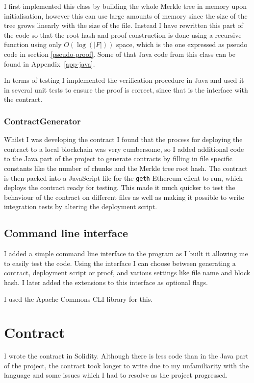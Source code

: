 \documentclass[12pt,a4paper,twoside,openright]{report}
\begin{document}
I first implemented this class by building the whole Merkle tree in memory upon initialisation,
however this can use large amounts of memory since the size of the tree grows linearly with the size of the file.
Instead I have rewritten this part of the code so that the root hash and proof construction is done using a recursive function using only $O(\log(|F|))$ space,
which is the one expressed as pseudo code in section \ref{pseudo-proof}. Some of that Java code from this class can be found in Appendix~\ref{app-java}.

In terms of testing I implemented the verification procedure in Java
and used it in several unit tests to ensure the proof is correct, since that is the interface with the contract.


\subsubsection{ContractGenerator}

Whilst I was developing the contract I found that the process for deploying the contract to a local blockchain was very cumbersome, so
I added additional code to the Java part of the project to generate contracts by filling in file specific constants like the number of chunks and the Merkle tree root hash.
The contract is then packed into a JavaScript file for the \texttt{geth} Ethereum client to run, which deploys the contract ready for testing.
This made it much quicker to test the behaviour of the contract on different files as well as making it possible to write integration tests by altering the deployment script.

\subsection{Command line interface}

I added a simple command line interface to the program as I built it allowing me to easily test the code.
Using the interface I can choose between generating a contract, deployment script or proof, and various settings
like file name and block hash.
I later added the extensions to this interface as optional flags.

I used the Apache Commons CLI library for this.


\section{Contract}

I wrote the contract in Solidity.
Although there is less code than in the Java part of the project, the contract took longer to write due to my unfamiliarity with the language and
some issues which I had to resolve as the project progressed.
\end{document}
